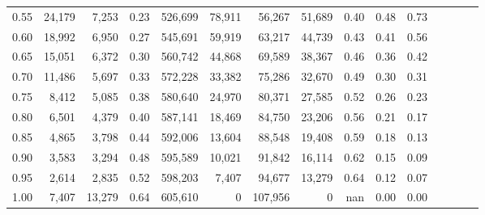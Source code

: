 \begin{tabular}{rrrcrrrrrrrrrrr}
0.55 &  24,179 &   7,253 &                                       0.23 &  526,699 &   78,911 &   56,267 &   51,689 &  0.40 &  0.48 &                         0.73 \\
0.60 &  18,992 &   6,950 &                                       0.27 &  545,691 &   59,919 &   63,217 &   44,739 &  0.43 &  0.41 &                         0.56 \\
0.65 &  15,051 &   6,372 &                                       0.30 &  560,742 &   44,868 &   69,589 &   38,367 &  0.46 &  0.36 &                         0.42 \\
0.70 &  11,486 &   5,697 &                                       0.33 &  572,228 &   33,382 &   75,286 &   32,670 &  0.49 &  0.30 &                         0.31 \\
0.75 &   8,412 &   5,085 &                                       0.38 &  580,640 &   24,970 &   80,371 &   27,585 &  0.52 &  0.26 &                         0.23 \\
0.80 &   6,501 &   4,379 &                                       0.40 &  587,141 &   18,469 &   84,750 &   23,206 &  0.56 &  0.21 &                         0.17 \\
0.85 &   4,865 &   3,798 &                                       0.44 &  592,006 &   13,604 &   88,548 &   19,408 &  0.59 &  0.18 &                         0.13 \\
0.90 &   3,583 &   3,294 &                                       0.48 &  595,589 &   10,021 &   91,842 &   16,114 &  0.62 &  0.15 &                         0.09 \\
0.95 &   2,614 &   2,835 &                                       0.52 &  598,203 &    7,407 &   94,677 &   13,279 &  0.64 &  0.12 &                         0.07 \\
1.00 &   7,407 &  13,279 &                                       0.64 &  605,610 &        0 &  107,956 &        0 &   nan &  0.00 &                         0.00 \\
\bottomrule
\end{tabular}
